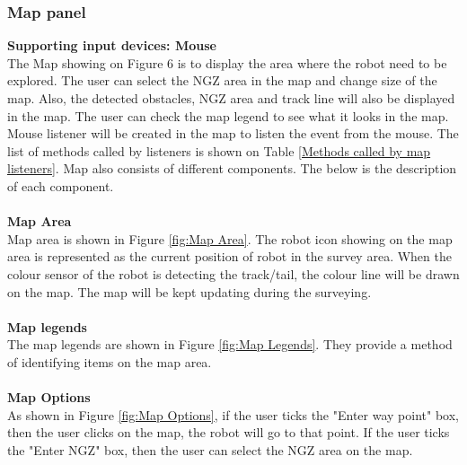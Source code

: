 \subsubsection{Map panel}
\textbf{Supporting input devices: Mouse}\\
The Map showing on Figure 6 is to display the area where the robot need to be explored. The user can select the NGZ area in the map and change size of the map. Also, the detected obstacles, NGZ area and track line will also be displayed in the map. The user can check the map legend to see what it looks in the map. Mouse listener will be created in the map to listen the event from the mouse. The list of methods called by listeners is shown on Table \ref{Methods called by map listeners}. Map also consists of different components. The below is the description of each component.\\
\\
\textbf{Map Area}\\
Map area is shown in Figure \ref{fig:Map Area}. The robot icon showing on the map area is represented as the current position of robot in the survey area. When the colour sensor of the robot is detecting the track/tail, the colour line will be drawn on the map. The map will be kept updating during the surveying.\\
\\
\textbf{Map legends} \\
The map legends are shown in Figure \ref{fig:Map Legends}. They provide a method of identifying items on the map area.\\
\\
\textbf{Map Options}\\
As shown in Figure \ref{fig:Map Options}, if the user ticks the "Enter way point" box, then the user clicks on the map, the robot will go to that point. If the user ticks the "Enter NGZ" box, then the user can select the NGZ area on the map.


